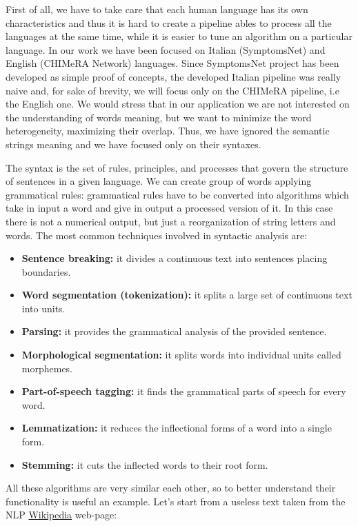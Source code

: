 \documentclass{standalone}
\begin{document}
First of all, we have to take care that each human language has its own characteristics and thus it is hard to create a pipeline ables to process all the languages at the same time, while it is easier to tune an algorithm on a particular language.
In our work we have been focused on Italian (\textsf{SymptomsNet}) and English (\textsf{CHIMeRA} Network) languages.
Since \textsf{SymptomsNet} project has been developed as simple proof of concepts, the developed Italian pipeline was really naive and, for sake of brevity, we will focus only on the \textsf{CHIMeRA} pipeline, i.e the English one.
We would stress that in our application we are not interested on the understanding of words meaning, but we want to minimize the word heterogeneity, maximizing their overlap.
Thus, we have ignored the semantic strings meaning and we have focused only on their syntaxes.

The syntax is the set of rules, principles, and processes that govern the structure of sentences in a given language.
We can create group of words applying grammatical rules: grammatical rules have to be converted into algorithms which take in input a word and give in output a processed version of it.
In this case there is not a numerical output, but just a reorganization of string letters and words.
The most common techniques involved in syntactic analysis are:

\begin{itemize}

  \item \textbf{Sentence breaking:} it divides a continuous text into sentences placing boundaries.
  \item \textbf{Word segmentation (tokenization):} it splits a large set of continuous text into units.
  \item \textbf{Parsing:} it provides the grammatical analysis of the provided sentence.
  \item \textbf{Morphological segmentation:} it splits words into individual units called morphemes.
  \item \textbf{Part-of-speech tagging:} it finds the grammatical parts of speech for every word.
  \item \textbf{Lemmatization:} it reduces the inflectional forms of a word into a single form.
  \item \textbf{Stemming:} it cuts the inflected words to their root form.

\end{itemize}

All these algorithms are very similar each other, so to better understand their functionality is useful an example.
Let's start from a useless text taken from the NLP \href{https://en.wikipedia.org/wiki/Natural_language_processing}{Wikipedia} web-page:
\end{document}
